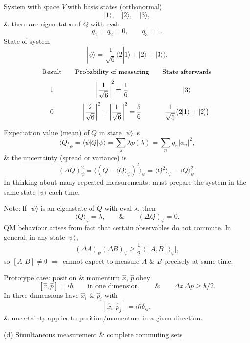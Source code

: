 \documentclass[11pt,a4paper]{article}
\begin{document}
System with space $V$ with basis states (orthonormal)
\[
    |1\rangle,\quad |2\rangle,\quad |3\rangle,
\]
\& these are eigenstates of $Q$ with evals
\[
    q_1=q_2=0,\qquad q_3=1.
\]
State of system
\[
    |\psi\rangle=\frac{1}{\sqrt{6}}\bigl(2|1\rangle+|2\rangle+|3\rangle\bigr).
\]
\[
\begin{array}{c@{\qquad}c@{\qquad}c}
    \text{Result} & \text{Probability of measuring} & \text{State afterwards}\\[6pt]
    1 & \left|\dfrac{1}{\sqrt{6}}\right|^2=\dfrac{1}{6}
      & |3\rangle\\[12pt]
    0 & \left|\dfrac{2}{\sqrt{6}}\right|^2
        +\left|\dfrac{1}{\sqrt{6}}\right|^2=\dfrac{5}{6}
      & \dfrac{1}{\sqrt{5}}\bigl(2|1\rangle+|2\rangle\bigr)
\end{array}
\]

\medskip
\underline{Expectation value} (mean) of $Q$ in state $|\psi\rangle$ is
\[
    \langle Q\rangle_\psi=\langle\psi|Q|\psi\rangle
    =\sum_\lambda\lambda p(\lambda)=\sum_n q_n|\alpha_n|^2,
\]
\& the \underline{uncertainty} (spread or variance) is
\[
    (\Delta Q)_\psi^2
    =\bigl\langle(Q-\langle Q\rangle_\psi)^2\bigr\rangle_\psi
    =\langle Q^2\rangle_\psi-\langle Q\rangle_\psi^2.
\]
In thinking about many repeated measurements: must prepare the system
in the same state $|\psi\rangle$ each time.

\medskip
\noindent
Note: If $|\psi\rangle$ is an eigenstate of $Q$ with eval $\lambda$, then
\[
    \langle Q\rangle_\psi=\lambda,
    \qquad\&\qquad (\Delta Q)_\psi=0.
\]
QM behaviour arises from fact that certain observables do not commute.
In general, in any state $|\psi\rangle$,
\[
    (\Delta A)_\psi(\Delta B)_\psi
    \geq\frac{1}{2}\bigl|\langle[A,B]\rangle_\psi\bigr|,
\]
so $[A,B]\neq0$ $\Rightarrow$ cannot expect to measure $A$ \& $B$
precisely at same time.


Prototype case: position \& momentum $\hat{x}$, $\hat{p}$ obey
\[
    [\hat{x},\hat{p}]=i\hbar\qquad\text{in one dimension},
    \qquad\&\qquad \Delta x\,\Delta p\geq\hbar/2.
\]
In three dimensions have $\hat{x}_i$ \& $\hat{p}_i$ with
\[
    [\hat{x}_i,\hat{p}_j]=i\hbar\delta_{ij},
\]
\& uncertainty applies to position/momentum in a given direction.

\medskip
\noindent
(d) \underline{Simultaneous measurement \& complete commuting sets}
\end{document}
